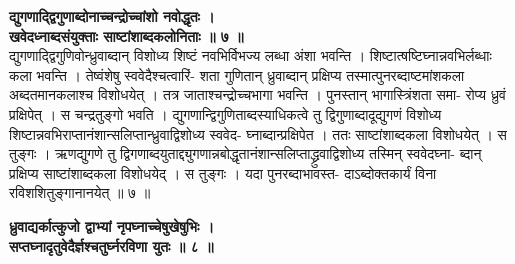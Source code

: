 \documentclass[11pt, openany]{book}
\begin{document}
{{{{\vspace{2mm}
\centering
\textbf{
 द्युगणाद्द्विगुणाब्दोनाच्चन्द्रोच्चांशो नवोद्धृतः । \\
 \hspace{1cm}
  खवेदध्नाब्दसंयुक्ताः साष्टांशाब्दकलोनिताः ॥ ७ ॥}\\
  
  \vspace{2mm}
  \justifying
 द्युगणाद्द्विगुणिवोन्ध्रुवाब्दान् विशोध्य शिष्टं नवभिर्विभज्य लब्धा
अंशा 
भवन्ति । शिष्टात्षष्टिघ्नान्नवभिर्लब्धाः कला भवन्ति । तेष्वंशेषु
स्ववेदैश्चत्वारिं-
शता गुणितान् ध्रुवाब्दान् प्रक्षिप्य तस्मात्पुनरब्दाष्टमांशकला
अब्दतमानकलाश्च 
विशोधयेत् । तत्र जाताश्चन्द्रोच्चभागा भवन्ति । पुनस्तान्
भागास्त्रिंशता समा-
रोप्य ध्रुवं प्रक्षिपेत् । स चन्द्रतुङ्गो भवति ।
द्युगणान्द्विगुणिताब्दस्याधिकत्वे तु 
द्विगुणाब्दादूद्युगणं विशोध्य
शिष्टान्नवभिराप्तानंशान्सलिप्तान्ध्रुवाद्विशोध्य स्ववेद-
घ्नाब्दान्प्रक्षिपेत । ततः साष्टांशाब्दकला विशोधयेत् । स तुङ्गः ।
ऋणद्युगणे 
तु द्विगणाब्दयुताद्द्युगणान्नबोद्धृतानंशान्सलिप्ताद्ध्रुवाद्विशोध्य
तस्मिन् स्ववेदघ्ना-
ब्दान् प्रक्षिप्य साष्टांशाब्दकला विशोधयेद् । स तुङ्गः । यदा
पुनरब्दाभावस्त-
दाऽब्दोक्तकार्यं विना रविशशितुङ्गानानयेत् ॥ ७ ॥


\newpage


\centering
\textbf{
 ध्रुवाद्यर्कात्कुजो द्वाभ्यां नृपघ्नाच्चेषुखेषुभिः ।\\
 सप्तघ्नादृतुवेदैर्ज्ञश्चतुर्घ्नरविणा युतः ॥ ८ ॥}
 
}}}}
\end{document}
